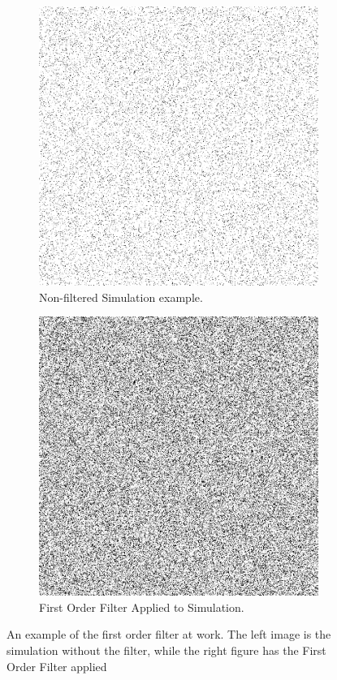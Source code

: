 \documentclass[12pt]{article} %
\begin{document}
\begin{figure}[h]
\begin{subfigure}[t]{.5\textwidth}
\centering
\includegraphics[width=\textwidth]{Sim.png} 
\caption{Non-filtered Simulation example.}
\end{subfigure}
\begin{subfigure}[t]{.5\textwidth}
\centering
\includegraphics[width=\textwidth]{FO.png} 
\caption{First Order Filter Applied to Simulation.}
\end{subfigure}
\caption{An example of the first order filter at work. The left image is the simulation without the filter, while the right figure has the First Order Filter applied}
\label{fig:FO}
\end{figure}
\end{document}
